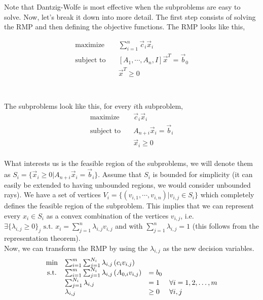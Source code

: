 \documentclass[11pt]{article}
\begin{document}
\noindent Note that Dantzig-Wolfe is most effective when the subproblems are easy to solve. Now, let's break it down into more detail.  The first step consists of solving the RMP and then defining the objective functions. The RMP looks like this,

$$
\begin{aligned}
    \text{maximize} \quad & \sum_{i=1}^{n} \vec{c}_i \vec{x}_i \\
    \text{subject to} \quad & [A_1, \cdots, A_n, I] \vec{x}^T = \vec{b}_0  \\
    & \vec{x}^T \geq 0\\
\end{aligned}
$$
\\
\\

\noindent The subproblems look like this, for every $i$th subproblem,
$$
\begin{aligned}
    \text{maximize} \quad & \vec{c}_i \vec{x}_i \\
    \text{subject to} \quad & A_{n+i} \vec{x}_i = \vec{b}_i \\
    & \vec{x}_i \geq 0
\end{aligned}
$$
\\

\noindent What interests us is the feasible region of the subproblems, we will denote them as $S_i = \{\vec{x}_i \geq 0 | A_{n+i} \vec{x}_i = \vec{b}_i\}$. Assume that $S_i$ is bounded for simplicity (it can easily be extended to having unbounded regions, we would consider unbounded rays). We have a set of vertices $V_i = \{(v_{i,1}, \cdots, v_{i,n}) | v_{i,j} \in S_i\}$ which completely defines the feasible region of the subproblem. This implies that we can represent every $x_i \in S_i$ as a convex combination of the vertices $v_{i,j}$, i.e. $\exists \{\lambda_{i,j} \geq 0\}_j \text{ s.t. } x_i = \sum_{j=1}^{n} \lambda_{i,j} v_{i,j}$ and with $\sum_{j=1}^{n} \lambda_{i,j} = 1$ (this follows from the representation theorem).
\\

\noindent Now, we can transform the RMP by using the $\lambda_{i,j}$ as the new decision variables.
\\

$$
\begin{array}{clll}
    \min & \sum_{i=1}^m \sum_{j=1}^{N_i} \lambda_{i, j}\left(c_i v_{i, j}\right) & & \\
    \mathrm{s.t.} & \sum_{i=1}^m \sum_{j=1}^{N_i} \lambda_{i, j}\left(A_{0, i} v_{i, j}\right) & =b_0 & \\
    & \sum_{j=1}^{N_i} \lambda_{i, j} & =1 & \forall i=1,2, \ldots, m \\
    & \lambda_{i, j} & \geq 0 & \forall i, j
\end{array}\\
$$
\end{document}
